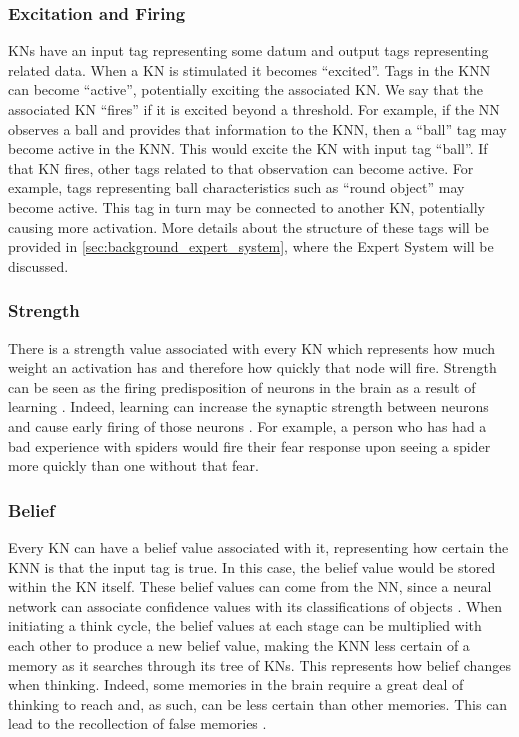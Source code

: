 \documentclass[titlepage,11pt]{article}
\begin{document}
\subsubsection{Excitation and Firing}
KNs have an input tag representing some datum and output tags representing related data. When a KN is stimulated it becomes ``excited''. Tags in the KNN can become ``active'', potentially exciting the associated KN. We say that the associated KN ``fires'' if it is excited beyond a threshold. For example, if the NN observes a ball and provides that information to the KNN, then a ``ball'' tag may become active in the KNN. This would excite the KN with input tag ``ball''. If that KN fires, other tags related to that observation can become active. For example, tags representing ball characteristics such as ``round object'' may become active. This tag in turn may be connected to another KN, potentially causing more activation. More details about the structure of these tags will be provided in \cref{sec:background_expert_system}, where the Expert System will be discussed.

\subsubsection{Strength}
There is a strength value associated with every KN which represents how much weight an activation has and therefore how quickly that node will fire. Strength can be seen as the firing predisposition of neurons in the brain as a result of learning \cite{vybihal-knowledge}. Indeed, learning can increase the synaptic strength between neurons and cause early  firing of those neurons \cite{hebb}. For example, a person who has had a bad experience with spiders would fire their fear response upon seeing a spider more quickly than one without that fear.

\subsubsection{Belief}
Every KN can have a belief value associated with it, representing how certain the KNN is that the input tag is true. In this case, the belief value would be stored within the KN itself. These belief values can come from the NN, since a neural network can associate confidence values with its classifications of objects \cite{mitchell1997machine}. When initiating a think cycle, the belief values at each stage can be multiplied with each other to produce a new belief value, making the KNN less certain of a memory as it searches through its tree of KNs. This represents how belief changes when thinking. Indeed, some memories in the brain require a great deal of thinking to reach and, as such, can be less certain than other memories. This can lead to the recollection of false memories \cite{falsememories}.
\end{document}
